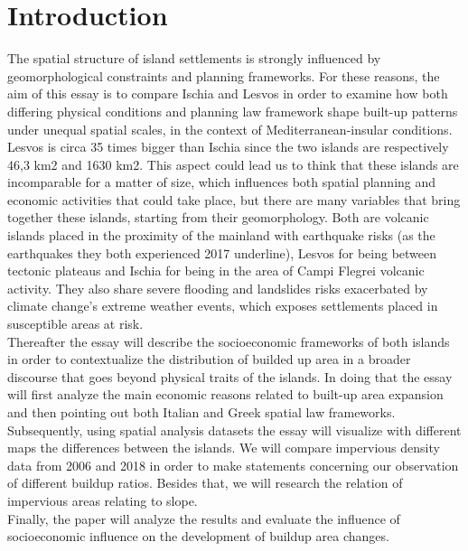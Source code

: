 \documentclass[10pt, twocolumn, twoside]{article}
\begin{document}


\maketitle
\section{Introduction}\label{sec1}
The spatial structure of island settlements is strongly influenced by geomorphological constraints and planning frameworks. For these reasons, the aim of this essay is to compare Ischia and Lesvos in order to examine how both differing physical conditions and planning law framework shape built-up patterns under unequal spatial scales, in the context of Mediterranean-insular conditions.\\
Lesvos is circa 35 times bigger than Ischia since the two islands are respectively 46,3 km2 and 1630 km2. This aspect could lead us to think that these islands are incomparable for a matter of size, which influences both spatial planning and economic activities that could take place, but there are many variables that bring together these islands, starting from their geomorphology. Both are volcanic islands placed in the proximity of the mainland with earthquake risks (as the earthquakes they both experienced 2017 underline), Lesvos for being between tectonic plateaus and Ischia for being in the area of Campi Flegrei volcanic activity. They also share severe flooding and landslides risks exacerbated by climate change’s extreme weather events, which exposes settlements placed in susceptible areas at risk.\\
Thereafter the essay will describe the socioeconomic frameworks of both islands in order to contextualize the distribution of builded up area in a broader discourse that goes beyond physical traits of the islands. In doing that the essay will first analyze the main economic reasons related to built-up area expansion and then pointing out both Italian and Greek spatial law frameworks.   \\
Subsequently, using spatial analysis datasets the essay will visualize with different maps the differences between the islands. We will compare impervious density data from 2006 and 2018 in order to make statements concerning our observation of different buildup ratios. Besides that, we will research the relation of impervious areas relating to slope.\\ 
Finally, the paper will analyze the results and evaluate the influence of socioeconomic influence on the development of buildup area changes.
\end{document}
